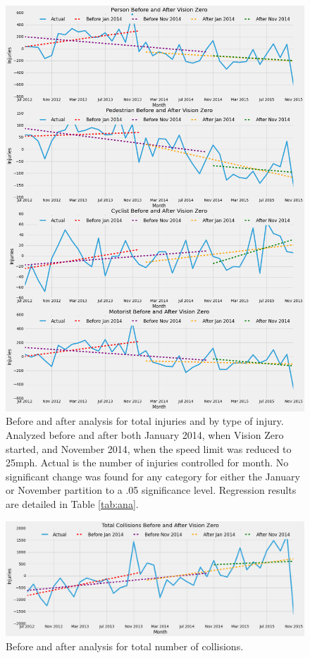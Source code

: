 \documentclass[10pt,journal,compsoc]{IEEEtran}
\begin{document}
\begin{figure}[p]
	\centering
	\includegraphics[width=\textwidth]{fig2.png}
	\caption{Before and after analysis for total injuries and by type of injury.  Analyzed before and after both January 2014, when Vision Zero started, and November 2014, when the speed limit was reduced to 25mph.  Actual is the number of injuries controlled for month.  No significant change was found for any category for either the January or November partition to a .05 significance level.  Regression results are detailed in Table \ref{tab:ana}.}\label{fig:injuryana}
\end{figure}

\begin{figure}[h]
	\centering
	\includegraphics[width=\textwidth]{fig3.png}
	\caption{Before and after analysis for total number of collisions.}\label{fig:totalana}
\end{figure}
\end{document}
